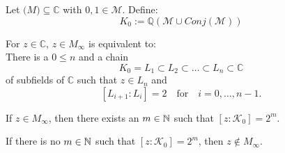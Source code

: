 \begin{frame}
    \begin{definition}
        \label{def:K_M_0}
        \leanok
        Let $\mathcal(M)\subseteq\mathbb{C}$ with $0,1 \in \mathcal{M}$. Define:
        \begin{equation*}
            K_0 := \mathbb{Q}(\mathcal{M}\cup Conj(\mathcal{M}))
        \end{equation*}
    \end{definition}
\end{frame}

\begin{frame}
    \begin{theorem}
        \label{thm:Classfication_z_in_M_inf}
        \leanok
        For $z \in \mathbb{C}$, $z \in M_{\infty}$ is equivalent to:\\
        There is a $0\le n$ and a chain 
        $$K_0 = L_1 \subset L_2 \subset \ldots \subset L_n \subset \mathbb{C}$$
        of subfields of $\mathbb{C}$ such that $z \in L_n$ and 
        $$ [L_{i+1}:L_i] = 2 \quad \text{for} \quad i = 0, \ldots, n-1.$$
    \end{theorem}

    
\end{frame}

\begin{frame}
    \begin{corollary}
        If $z \in M_{\infty}$, then there exists an $m\in \mathbb{N}$ such that $[z:\mathcal{K}_0] = 2^m$.
    \end{corollary}

\begin{corollary}[Classfication]
    If there is no $m\in \mathbb{N}$ such that $[z:\mathcal{K}_0] = 2^m$, then $z \notin M_{\infty}$.
\end{corollary}

\end{frame}